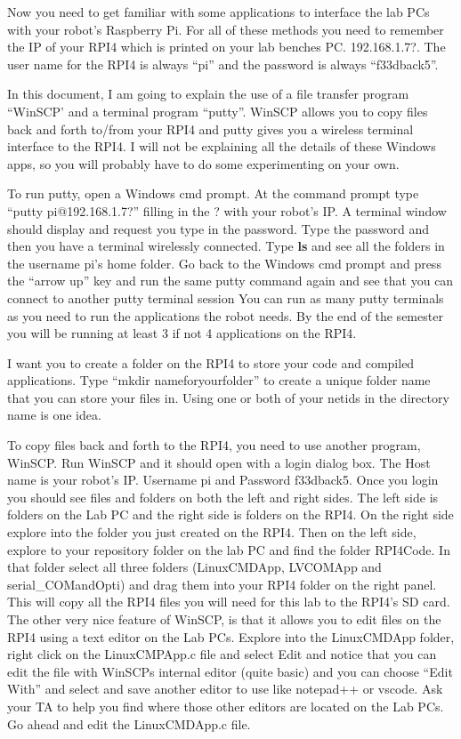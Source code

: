 \documentclass[11pt]{article}
\begin{document}
    Now you need to get familiar with some applications to interface the lab PCs with your robot’s Raspberry Pi. For all of these methods you need to remember the IP of your RPI4 which is printed on your lab benches PC. 192.168.1.7?. The user name for the RPI4 is always “pi” and the password is always “f33dback5”.

    In this document, I am going to explain the use of a file transfer program “WinSCP’ and a terminal program “putty”. WinSCP allows you to copy files back and forth to/from your RPI4 and putty gives you a wireless terminal interface to the RPI4. I will not be explaining all the details of these Windows apps, so you will probably have to do some experimenting on your own.

    To run putty, open a Windows cmd prompt. At the command prompt type “putty pi@192.168.1.7?” filling in the ? with your robot’s IP. A terminal window should display and request you type in the password. Type the password and then you have a terminal wirelessly connected. Type \textbf{ls} and see all the folders in the username pi’s home folder. Go back to the Windows cmd prompt and press the “arrow up” key and run the same putty command again and see that you can connect to another putty terminal session You can run as many putty terminals as you need to run the applications the robot needs. By the end of the semester you will be running at least 3 if not 4 applications on the RPI4.

    I want you to create a folder on the RPI4 to store your code and compiled applications. Type “mkdir nameforyourfolder” to create a unique folder name that you can store your files in. Using one or both of your netids in the directory name is one idea.

    To copy files back and forth to the RPI4, you need to use another program, WinSCP. Run WinSCP and it should open with a login dialog box. The Host name is your robot’s IP. Username pi and Password f33dback5. Once you login you should see files and folders on both the left and right sides. The left side is folders on the Lab PC and the right side is folders on the RPI4. On the right side explore into the folder you just created on the RPI4. Then on the left side, explore to your repository folder on the lab PC and find the folder RPI4Code. In that folder select all three folders (LinuxCMDApp, LVCOMApp and serial\_COMandOpti) and drag them into your RPI4 folder on the right panel. This will copy all the RPI4 files you will need for this lab to the RPI4’s SD card. The other very nice feature of WinSCP, is that it allows you to edit files on the RPI4 using a text editor on the Lab PCs. Explore into the LinuxCMDApp folder, right click on the LinuxCMPApp.c file and select Edit and notice that you can edit the file with WinSCPs internal editor (quite basic) and you can choose “Edit With” and select and save another editor to use like notepad++ or vscode. Ask your TA to help you find where those other editors are located on the Lab PCs. Go ahead and edit the LinuxCMDApp.c file.
\end{document}
